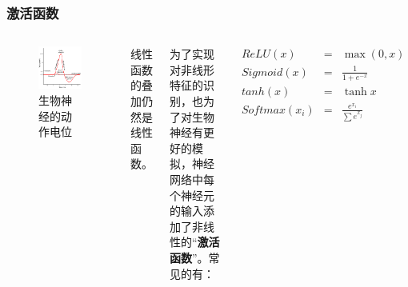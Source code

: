 \begin{frame}
    \frametitle{激活函数}
    \begin{columns}
        \begin{figure}

            \includegraphics[width=\linewidth]{../lib/neuron.png}
            \caption{生物神经的动作电位}
        \end{figure}

        线性函数的叠加仍然是线性函数。

        为了实现对非线形特征的识别，也为了对生物神经有更好的模拟，神经网络中每个神经元的输入添加了非线性的“\textbf{激活
            函数}”。常见的有：

        \begin{eqnarray}
            ReLU(x)&=&\max(0,x)\\
            Sigmoid(x)&=&\frac {1}{1+e^{-x}}\\
            tanh(x)&=&\tanh{x}\\
            Softmax(x_i)&=&\frac{e^{x_i}}{\sum e^{x_j}}
        \end{eqnarray}
    \end{columns}
\end{frame}

